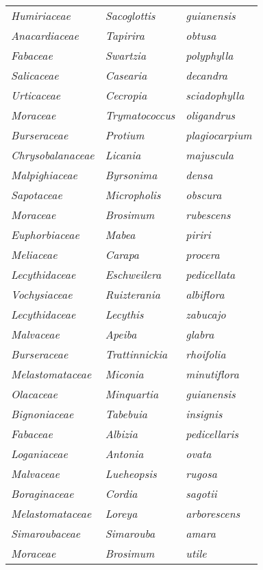 \documentclass[fleqn,10pt]{ArtEcoFoG} %
\renewenvironment{table}{\begin{table*}}{\end{table*}\ignorespacesafterend}
\begin{document}
\begin{table}
\begin{tabular}[t]{lll}
\addlinespace
\em{Humiriaceae} & \em{Sacoglottis} & \em{guianensis}\\
\em{Anacardiaceae} & \em{Tapirira} & \em{obtusa}\\
\em{Fabaceae} & \em{Swartzia} & \em{polyphylla}\\
\em{Salicaceae} & \em{Casearia} & \em{decandra}\\
\em{Urticaceae} & \em{Cecropia} & \em{sciadophylla}\\
\addlinespace
\em{Moraceae} & \em{Trymatococcus} & \em{oligandrus}\\
\em{Burseraceae} & \em{Protium} & \em{plagiocarpium}\\
\em{Chrysobalanaceae} & \em{Licania} & \em{majuscula}\\
\em{Malpighiaceae} & \em{Byrsonima} & \em{densa}\\
\em{Sapotaceae} & \em{Micropholis} & \em{obscura}\\
\addlinespace
\em{Moraceae} & \em{Brosimum} & \em{rubescens}\\
\em{Euphorbiaceae} & \em{Mabea} & \em{piriri}\\
\em{Meliaceae} & \em{Carapa} & \em{procera}\\
\em{Lecythidaceae} & \em{Eschweilera} & \em{pedicellata}\\
\em{Vochysiaceae} & \em{Ruizterania} & \em{albiflora}\\
\addlinespace
\em{Lecythidaceae} & \em{Lecythis} & \em{zabucajo}\\
\em{Malvaceae} & \em{Apeiba} & \em{glabra}\\
\em{Burseraceae} & \em{Trattinnickia} & \em{rhoifolia}\\
\em{Melastomataceae} & \em{Miconia} & \em{minutiflora}\\
\em{Olacaceae} & \em{Minquartia} & \em{guianensis}\\
\addlinespace
\em{Bignoniaceae} & \em{Tabebuia} & \em{insignis}\\
\em{Fabaceae} & \em{Albizia} & \em{pedicellaris}\\
\em{Loganiaceae} & \em{Antonia} & \em{ovata}\\
\em{Malvaceae} & \em{Lueheopsis} & \em{rugosa}\\
\em{Boraginaceae} & \em{Cordia} & \em{sagotii}\\
\addlinespace
\em{Melastomataceae} & \em{Loreya} & \em{arborescens}\\
\em{Simaroubaceae} & \em{Simarouba} & \em{amara}\\
\em{Moraceae} & \em{Brosimum} & \em{utile}\\

\end{tabular}
\end{table}
\end{document}

